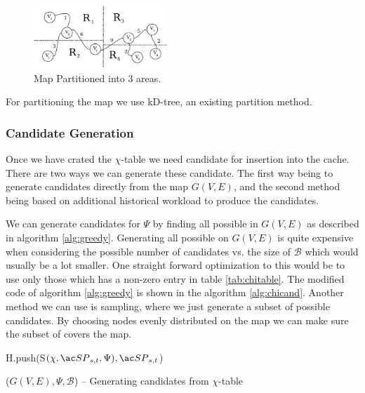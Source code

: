 \begin{figure}[bht]
  \center
        \includegraphics[width=0.45\textwidth]{figures/mappartition}
        \caption{Map Partitioned into 3 areas.}
  \label{fig:fillcache}
\end{figure}

For partitioning the map we use kD-tree, an existing partition method.




\subsubsection{Candidate Generation}

Once we have crated the $\chi$-table we need candidate \spaths for insertion into the cache. There are two ways we can generate these candidate. The first way being to generate candidates directly from the map $G(V,E)$, and the second method being based on additional historical workload to produce the candidates.

We can generate candidates for $\Psi$ by finding all possible \spath in $G(V,E)$ as described in algorithm \ref{alg:greedy}. Generating all \spath possible on $G(V,E)$ is quite expensive when considering the possible number of candidates vs. the size of $\mathcal{B}$ which would usually be a lot smaller. One straight forward optimization to this would be to use only those \spath which has a non-zero entry in table \ref{tab:chitable}. The modified code of algorithm \ref{alg:greedy} is shown in the algorithm \ref{alg:chicand}. Another method we can use is sampling, where we just generate a subset of possible candidates. By choosing nodes evenly distributed on the map we can make sure the subset of \spaths covers the map.

\begin{algorithm}[H!bt]
\dontprintsemicolon
\SetVline

{
    H.push(S$(\chi, \spath_{s,t}, \Psi), \spath_{s,t}$) \;
}

\caption{\salgons($G(V,E), \Psi, \mathcal{B}$) -- Generating candidates from $\chi$-table}
\label{alg:chicand}
\end{algorithm}


